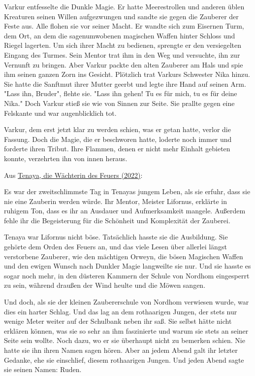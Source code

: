 \documentclass[10pt, a4paper, oneside]{book}
\newcommand{\refstorytext}[1]{\hyperref[Storytext: #1]{#1}}
\begin{document}
\begin{multicols}{2}
Varkur entfesselte die Dunkle Magie. Er hatte Meerestrollen und anderen üblen Kreaturen seinen Willen aufgezwungen und sandte sie gegen die Zauberer der Feste aus. Alle flohen sie vor seiner Macht. Er wandte sich zum Eisernen Turm, dem Ort, an dem die sagenumwobenen magischen Waffen hinter Schloss und Riegel lagerten. Um sich ihrer Macht zu bedienen, sprengte er den versiegelten Eingang des Turmes. Sein Mentor trat ihm in den Weg und versuchte, ihn zur Vernunft zu bringen. Aber Varkur packte den alten Zauberer am Hals und spie ihm seinen ganzen Zorn ins Gesicht. Plötzlich trat Varkurs Schwester Nika hinzu. Sie hatte die Sanftmut ihrer Mutter geerbt und legte ihre Hand auf seinen Arm. "Lass ihn, Bruder", flehte sie. "Lass ihn gehen! Tu es für mich, tu es für deine Nika." Doch Varkur stieß sie wie von Sinnen zur Seite. Sie prallte gegen eine Felskante und war augenblicklich tot.

Varkur, dem erst jetzt klar zu werden schien, was er getan hatte, verlor die Fassung. Doch die Magie, die er beschworen hatte, loderte noch immer und forderte ihren Tribut. Ihre Flammen, denen er nicht mehr Einhalt gebieten konnte, verzehrten ihn von innen heraus.




\begin{center}
     Aus \refstorytext{Tenaya, die Wächterin des Feuers (2022)}:
\end{center}

Es war der zweitschlimmste Tag in Tenayas jungem Leben, als sie erfuhr, dass sie nie eine Zauberin werden würde. Ihr Mentor, Meister Lifornus, erklärte in ruhigem Ton, dass es ihr an Ausdauer und Aufmerksamkeit mangele. Außerdem fehle ihr die Begeisterung für die Schönheit und Komplexität der Zauberei.

Tenaya war Lifornus nicht böse. Tatsächlich hasste sie die Ausbildung. Sie gehörte dem Orden des Feuers an, und das viele Lesen über allerlei längst verstorbene Zauberer, wie den mächtigen Orweyn, die bösen Magischen Waffen und den ewigen Wunsch nach Dunkler Magie langweilte sie nur. Und sie hasste es sogar noch mehr, in den düsteren Kammern der Schule von Nordhom eingesperrt zu sein, während draußen der Wind heulte und die Möwen sangen.

Und doch, als sie der kleinen Zaubererschule von Nordhom verwiesen wurde, war dies ein harter Schlag. Und das lag an dem rothaarigen Jungen, der stets nur wenige Meter weiter auf der Schulbank neben ihr saß. Sie selbst hätte nicht erklären können, was sie so sehr an ihm faszinierte und warum sie stets an seiner Seite sein wollte. Noch dazu, wo er sie überhaupt nicht zu bemerken schien. Nie hatte sie ihn ihren Namen sagen hören. Aber an jedem Abend galt ihr letzter Gedanke, ehe sie einschlief, diesem rothaarigen Jungen. Und jeden Abend sagte sie seinen Namen: Ruden.


\end{multicols}
\end{document}
